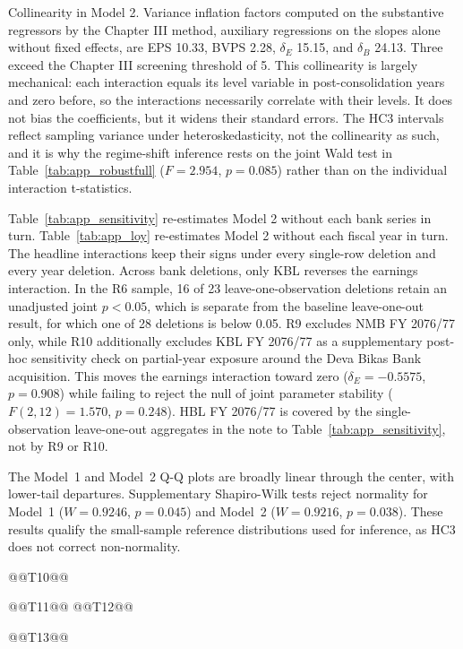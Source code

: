 Collinearity in Model 2. Variance inflation factors computed on the substantive regressors by the Chapter III method, auxiliary regressions on the slopes alone without fixed effects, are EPS 10.33, BVPS 2.28, $\delta_E$ 15.15, and $\delta_B$ 24.13. Three exceed the Chapter III screening threshold of 5. This collinearity is largely mechanical: each interaction equals its level variable in post-consolidation years and zero before, so the interactions necessarily correlate with their levels. It does not bias the coefficients, but it widens their standard errors. The HC3 intervals reflect sampling variance under heteroskedasticity, not the collinearity as such, and it is why the regime-shift inference rests on the joint Wald test in Table~\ref{tab:app_robustfull} ($F = 2.954$, $p = 0.085$) rather than on the individual interaction t-statistics.

Table~\ref{tab:app_sensitivity} re-estimates Model 2 without each bank series in turn. Table~\ref{tab:app_loy} re-estimates Model 2 without each fiscal year in turn. The headline interactions keep their signs under every single-row deletion and every year deletion. Across bank deletions, only KBL reverses the earnings interaction. In the R6 sample, 16 of 23 leave-one-observation deletions retain an unadjusted joint $p<0.05$, which is separate from the baseline leave-one-out result, for which one of 28 deletions is below 0.05. R9 excludes NMB FY 2076/77 only, while R10 additionally excludes KBL FY 2076/77 as a supplementary post-hoc sensitivity check on partial-year exposure around the Deva Bikas Bank acquisition. This moves the earnings interaction toward zero ($\delta_E = -0.5575$, $p = 0.908$) while failing to reject the null of joint parameter stability ($F(2,12) = 1.570$, $p = 0.248$). HBL FY 2076/77 is covered by the single-observation leave-one-out aggregates in the note to Table~\ref{tab:app_sensitivity}, not by R9 or R10.

The Model~1 and Model~2 Q-Q plots are broadly linear through the center, with lower-tail departures. Supplementary Shapiro-Wilk tests reject normality for Model~1 ($W=0.9246$, $p=0.045$) and Model~2 ($W=0.9216$, $p=0.038$). These results qualify the small-sample reference distributions used for inference, as HC3 does not correct non-normality.

@@T10@@

@@T11@@
@@T12@@

@@T13@@
